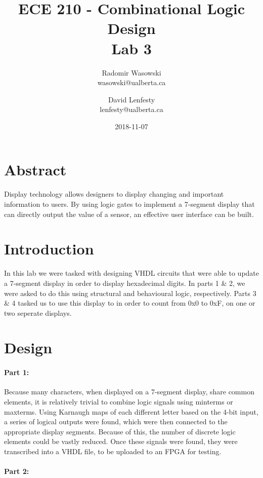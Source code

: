 \documentclass{article}
\title{ECE 210 - Combinational Logic Design \\ Lab 3}
\date{2018-11-07}
\author{Radomir Wasowski \\ wasowski@ualberta.ca
        \and David Lenfesty \\ lenfesty@ualberta.ca}
\begin{document}
\doublespacing
\maketitle
\newpage

\singlespacing

\section{Abstract}

Display technology allows designers to display changing and important information to users.
By using logic gates to implement a 7-segment display that can directly output the value of a sensor,
an effective user interface can be built.

\section{Introduction}

In this lab we were tasked with designing VHDL circuits that were able to update a 7-segment display
in order to display hexadecimal digits.
In parts 1 \& 2, we were asked to do this using structural and behavioural logic, respectively.
Parts 3 \& 4 tasked us to use this display to in order to count from 0x0 to 0xF, on one or two seperate displays.

\section{Design}

\paragraph{Part 1:}

Because many characters, when displayed on a 7-segment display, share common elements,
it is relatively trivial to combine logic signals using minterms or maxterms.
Using Karnaugh maps of each different letter based on the 4-bit input, a series of logical outputs
were found, which were then connected to the appropriate display segments.
Because of this, the number of discrete logic elements could be vastly reduced.
Once these signals were found, they were transcribed into a VHDL file,
to be uploaded to an FPGA for testing.

\paragraph{Part 2:}
\end{document}
